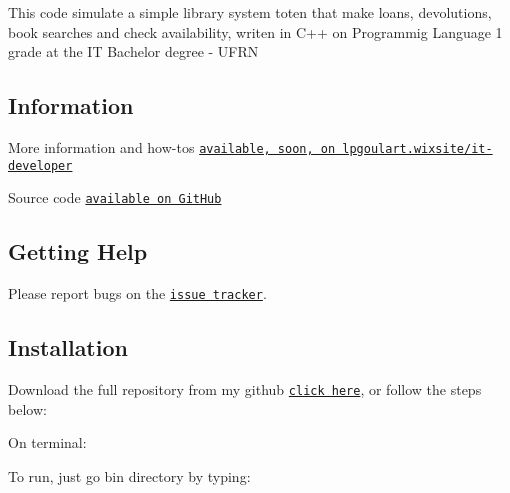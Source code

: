 This code simulate a simple library system toten that make loans, devolutions, book searches and check availability, writen in C++ on Programmig Language 1 grade at the IT Bachelor degree -\/ U\+F\+RN

\subsection*{Information}


\begin{DoxyItemize}
\item More information and how-\/tos \href{https://lpgoulart.wixsite.com/it-developer}{\tt available, soon, on lpgoulart.\+wixsite/it-\/developer}
\item Source code \href{https://github.com/lpgoulart/Library}{\tt available on Git\+Hub}
\end{DoxyItemize}

\subsection*{Getting Help}


\begin{DoxyItemize}
\item Please report bugs on the \href{https://github.com/lpgoulart/Library/issues}{\tt issue tracker}.
\end{DoxyItemize}

\subsection*{Installation}


\begin{DoxyItemize}
\item Download the full repository from my github \href{https://github.com/lpgoulart/Library}{\tt click here}, or follow the steps below\+:
\item On terminal\+:
\end{DoxyItemize}





\begin{DoxyItemize}
\item To run, just go bin directory by typing\+:
\end{DoxyItemize}


